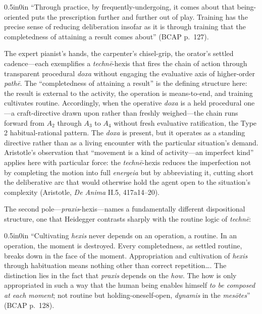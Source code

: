 \documentclass{article}
\begin{document}
\begin{adjustwidth}{0.5in}{0in}
``Through practice, by frequently-undergoing, it comes about that being-oriented puts the prescription further and further out of play. Training has the precise sense of reducing deliberation insofar as it is through training that the completedness of attaining a result comes about'' (BCAP p.~127).
\end{adjustwidth}

The expert pianist's hands, the carpenter's chisel-grip, the orator's settled cadence---each exemplifies a \textit{techn\=e}-hexis that fires the chain of action through transparent procedural \textit{doxa} without engaging the evaluative axis of higher-order \textit{path\=e}. The ``completedness of attaining a result'' is the defining structure here: the result is external to the activity, the operation is means-to-end, and training cultivates routine. Accordingly, when the operative \textit{doxa} is a held procedural one---a craft-directive drawn upon rather than freshly weighed---the chain runs forward from $A_2$ through $A_3$ to $A_4$ without fresh evaluative ratification, the Type 2 habitual-rational pattern. The \textit{doxa} is present, but it operates as a standing directive rather than as a living encounter with the particular situation's demand. Aristotle's observation that ``movement is a kind of activity---an imperfect kind'' applies here with particular force: the \textit{techn\=e}-hexis reduces the imperfection not by completing the motion into full \textit{energeia} but by abbreviating it, cutting short the deliberative arc that would otherwise hold the agent open to the situation's complexity (Aristotle, \textit{De Anima} II.5, 417a14--20).

The second pole---\textit{praxis}-hexis---names a fundamentally different dispositional structure, one that Heidegger contrasts sharply with the routine logic of \textit{techn\=e}:

\begin{adjustwidth}{0.5in}{0in}
``Cultivating \textit{hexis} never depends on an operation, a routine. In an operation, the moment is destroyed. Every completedness, as settled routine, breaks down in the face of the moment. Appropriation and cultivation of \textit{hexis} through habituation means nothing other than correct repetition\ldots. The distinction lies in the fact that \textit{praxis} depends on the \textit{how}. The how is only appropriated in such a way that the human being enables himself \textit{to be composed at each moment}; not routine but holding-oneself-open, \textit{dynamis} in the \textit{mes\=otes}'' (BCAP p.~128).
\end{adjustwidth}
\end{document}

